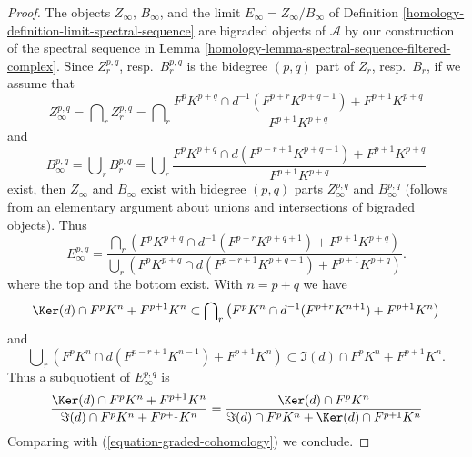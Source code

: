 \begin{proof}

The objects $Z_\infty$, $B_\infty$, and the limit
$E_\infty = Z_\infty/B_\infty$ of
Definition \ref{homology-definition-limit-spectral-sequence}
are bigraded objects of $\mathcal{A}$ by our construction of the
spectral sequence in Lemma \ref{homology-lemma-spectral-sequence-filtered-complex}.
Since $Z_r^{p, q}$, resp.\ $B_r^{p, q}$ is the bidegree $(p, q)$
part of $Z_r$, resp.\ $B_r$, if we assume that
$$
Z_\infty^{p, q} = \bigcap\nolimits_r Z_r^{p, q} =
\bigcap\nolimits_r
\frac{F^pK^{p + q} \cap d^{-1}(F^{p + r}K^{p + q + 1}) + F^{p + 1}K^{p + q}}
{F^{p + 1}K^{p + q}}
$$
and
$$
B_\infty^{p, q} = \bigcup\nolimits_r B_r^{p, q} =
\bigcup\nolimits_r
\frac{F^pK^{p + q} \cap d(F^{p - r + 1}K^{p + q - 1}) + F^{p + 1}K^{p + q}}
{F^{p + 1}K^{p + q}}
$$
exist, then $Z_\infty$ and $B_\infty$ exist with bidegree $(p, q)$
parts $Z_\infty^{p, q}$ and $B_\infty^{p, q}$ (follows from an elementary
argument about unions and intersections of bigraded objects). Thus
$$
E_\infty^{p, q} =
\frac{\bigcap_r (F^pK^{p + q} \cap d^{-1}(F^{p + r}K^{p + q + 1})
+ F^{p + 1}K^{p + q})}
{\bigcup_r (F^pK^{p + q} \cap d(F^{p - r + 1}K^{p + q - 1})
+ F^{p + 1}K^{p + q})}.
$$
where the top and the bottom exist. With $n = p + q$ we have
\begin{equation}
\label{equation-on-top-bigraded}
\Ker(d) \cap F^pK^{n} + F^{p + 1}K^{n}
\subset
\bigcap\nolimits_r
\left(
F^pK^{n} \cap d^{-1}(F^{p + r}K^{n + 1}) + F^{p + 1}K^{n}
\right)
\end{equation}
and
\begin{equation}
\label{equation-at-bottom-bigraded}
\bigcup\nolimits_r
\left(
F^pK^{n} \cap d(F^{p - r + 1}K^{n - 1}) + F^{p + 1}K^{n}
\right)
\subset
\Im(d) \cap F^pK^{n} + F^{p + 1}K^{n}.
\end{equation}
Thus a subquotient of $E_\infty^{p, q}$ is
$$
\frac{\Ker(d) \cap F^pK^{n} + F^{p + 1}K^n}
{\Im(d) \cap F^pK^{n} + F^{p + 1}K^{n}} =
\frac{\Ker(d) \cap F^pK^n}{\Im(d) \cap F^pK^n + \Ker(d) \cap F^{p + 1}K^n}
$$
Comparing with (\ref{equation-graded-cohomology}) we conclude.
\end{proof}


